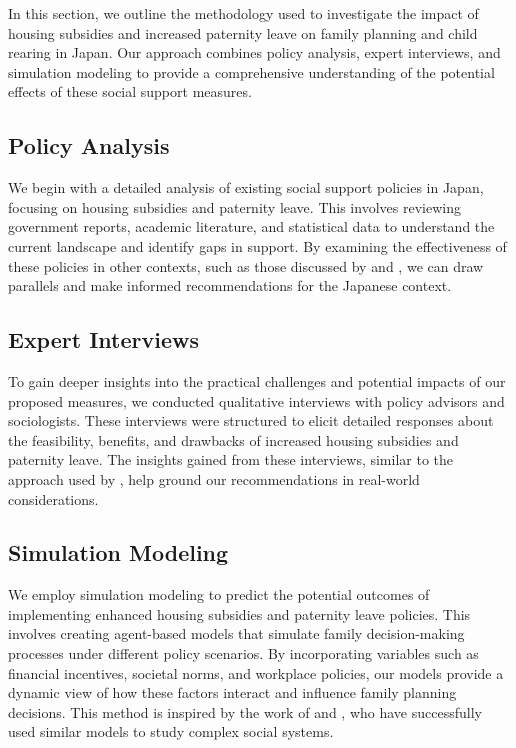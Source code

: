 \documentclass{article} %
\begin{document}
In this section, we outline the methodology used to investigate the impact of housing subsidies and increased paternity leave on family planning and child rearing in Japan. Our approach combines policy analysis, expert interviews, and simulation modeling to provide a comprehensive understanding of the potential effects of these social support measures.

\subsection{Policy Analysis}
We begin with a detailed analysis of existing social support policies in Japan, focusing on housing subsidies and paternity leave. This involves reviewing government reports, academic literature, and statistical data to understand the current landscape and identify gaps in support. By examining the effectiveness of these policies in other contexts, such as those discussed by \citet{park2023generative} and \citet{shanahan2023role}, we can draw parallels and make informed recommendations for the Japanese context.

\subsection{Expert Interviews}
To gain deeper insights into the practical challenges and potential impacts of our proposed measures, we conducted qualitative interviews with policy advisors and sociologists. These interviews were structured to elicit detailed responses about the feasibility, benefits, and drawbacks of increased housing subsidies and paternity leave. The insights gained from these interviews, similar to the approach used by \citet{liu2023agentbench}, help ground our recommendations in real-world considerations.

\subsection{Simulation Modeling}
We employ simulation modeling to predict the potential outcomes of implementing enhanced housing subsidies and paternity leave policies. This involves creating agent-based models that simulate family decision-making processes under different policy scenarios. By incorporating variables such as financial incentives, societal norms, and workplace policies, our models provide a dynamic view of how these factors interact and influence family planning decisions. This method is inspired by the work of \citet{poledna2023economic} and \citet{west2023agent}, who have successfully used similar models to study complex social systems.
\end{document}
